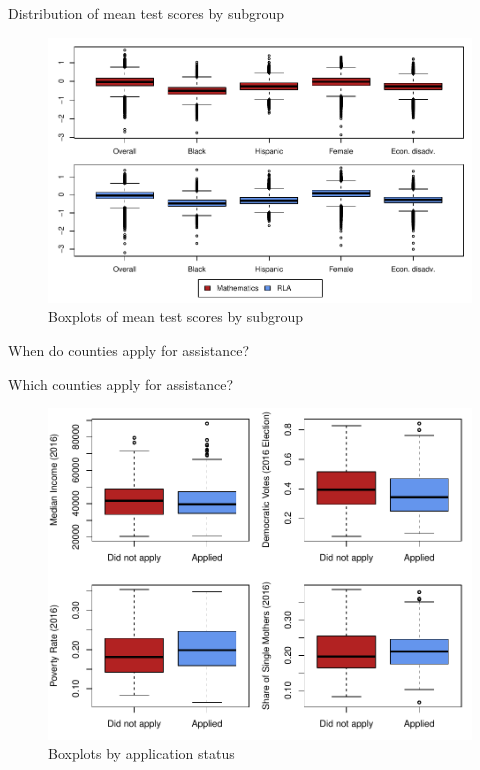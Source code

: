 \documentclass[hyperref={colorlinks = true,linkcolor = blue, citecolor=blue,urlcolor=blue}]{beamer}
\begin{document}
\begin{frame}{Distribution of mean test scores by subgroup}
	\begin{figure}[!h]
		\centering
		\includegraphics[scale=0.68]{"../Code & Data/DepVarsBoxplot.pdf"}
		\caption{Boxplots of mean test scores by subgroup}
		\label{DepVarsBoxplot}
	\end{figure}
\end{frame}

\begin{frame}{When do counties apply for assistance?}
	
\end{frame}

\begin{frame}{Which counties apply for assistance?}
	\begin{figure}[!h]
		\centering
		\includegraphics[scale=0.58]{"../Code & Data/AssistanceCovBoxplot.pdf"}
		\caption{Boxplots by application status}
		\label{AssistCovBoxplot}
	\end{figure}
\end{frame}
\end{document}
